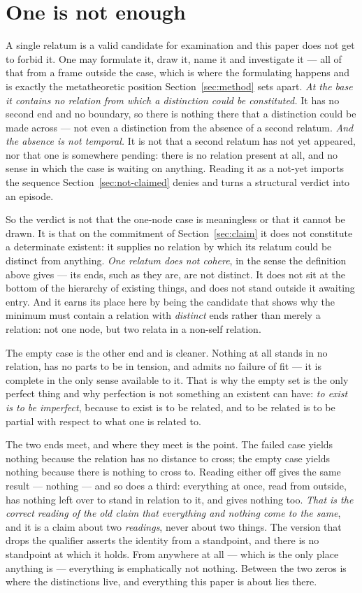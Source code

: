 \documentclass[11pt,a4paper]{article}
\theoremstyle{remark}\newtheorem{remark}[proposition]{Remark}
\begin{document}
\section{One is not enough}\label{sec:one-not-enough}
A single relatum is a valid candidate for examination and this paper does not get to forbid it. One
may formulate it, draw it, name it and investigate it --- all of that from a frame outside the case,
which is where the formulating happens and is exactly the metatheoretic position
Section~\ref{sec:method} sets apart. \emph{At the base it contains no relation from which a distinction
could be constituted.} It has no second end and no boundary, so there is nothing there that a
distinction could be made across --- not even a distinction from the absence of a second relatum.
\emph{And the absence is not temporal.} It is not that a second relatum has not yet appeared, nor that
one is somewhere pending: there is no relation present at all, and no sense in which the case is
waiting on anything. Reading it as a not-yet imports the sequence Section~\ref{sec:not-claimed} denies
and turns a structural verdict into an episode.

So the verdict is not that the one-node case is meaningless or that it cannot be drawn. It is that on
the commitment of Section~\ref{sec:claim} it does not constitute a determinate existent: it supplies
no relation by which its relatum could be distinct from anything. \emph{One relatum does not cohere},
in the sense the definition above gives --- its ends, such as they are, are not distinct. It does not
sit at the bottom of the hierarchy of existing things, and does not stand outside it awaiting entry. And it earns its place here
by being the candidate that shows why the minimum must contain a relation with \emph{distinct} ends
rather than merely a relation: not one node, but two relata in a non-self relation.

The empty case is the other end and is cleaner. Nothing at all stands in no relation, has no parts to be
in tension, and admits no failure of fit --- it is complete in the only sense available to it. That is
why the empty set is the only perfect thing and why perfection is not something an existent can have:
\emph{to exist is to be imperfect}, because to exist is to be related, and to be related is to be
partial with respect to what one is related to.

The two ends meet, and where they meet is the point. The failed case yields nothing because the
relation has no distance to cross; the empty case yields nothing because there is nothing to cross to.
Reading either off gives the same result --- nothing --- and so does a third: everything at once, read
from outside, has nothing left over to stand in relation to it, and gives nothing too. \emph{That is the
correct reading of the old claim that everything and nothing come to the same}, and it is a claim about
two \emph{readings}, never about two things. The version that drops the qualifier asserts the identity
from a standpoint, and there is no standpoint at which it holds. From anywhere at all --- which is the
only place anything is --- everything is emphatically not nothing. Between the two zeros is where the
distinctions live, and everything this paper is about lies there.
\end{document}
